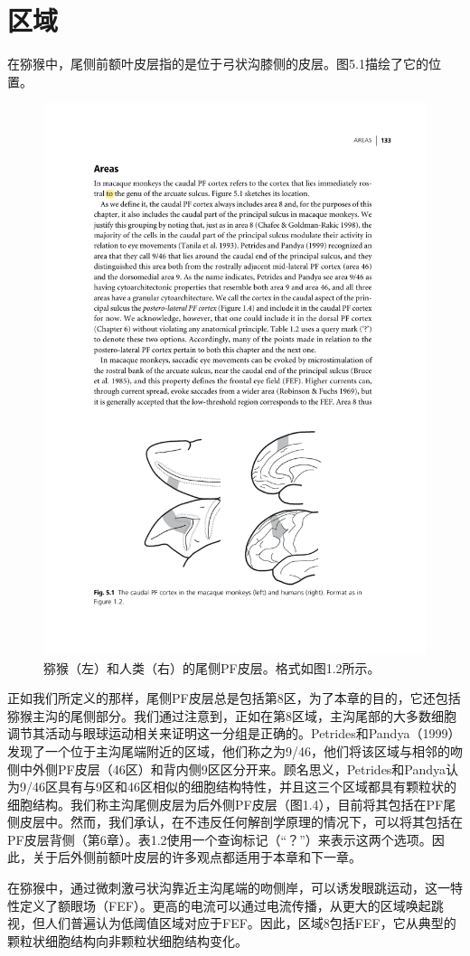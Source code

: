 \section{区域}
在猕猴中，尾侧前额叶皮层指的是位于弓状沟膝侧的皮层。图5.1描绘了它的位置。
\begin{figure}
	\centering
	\includegraphics[width=0.7\linewidth]{image_pfc/Fig_5_1}
	\caption{猕猴（左）和人类（右）的尾侧PF皮层。格式如图1.2所示。}
	\label{fig:fig}
\end{figure}

正如我们所定义的那样，尾侧PF皮层总是包括第8区，为了本章的目的，它还包括猕猴主沟的尾侧部分。我们通过注意到，正如在第8区域\cite{Chafee & Goldman-Rakic 1998}，主沟尾部的大多数细胞调节其活动与眼球运动相关\cite{Tanila et al. 1993}来证明这一分组是正确的。Petrides和Pandya（1999）发现了一个位于主沟尾端附近的区域，他们称之为9/46，他们将该区域与相邻的吻侧中外侧PF皮层（46区）和背内侧9区区分开来。顾名思义，Petrides和Pandya认为9/46区具有与9区和46区相似的细胞结构特性，并且这三个区域都具有颗粒状的细胞结构。我们称主沟尾侧皮层为后外侧PF皮层（图1.4），目前将其包括在PF尾侧皮层中。然而，我们承认，在不违反任何解剖学原理的情况下，可以将其包括在PF皮层背侧（第6章）。表1.2使用一个查询标记（“？”）来表示这两个选项。因此，关于后外侧前额叶皮层的许多观点都适用于本章和下一章。

在猕猴中，通过微刺激弓状沟靠近主沟尾端的吻侧岸，可以诱发眼跳运动\cite{Bruce et al. 1985}，这一特性定义了额眼场（FEF）。更高的电流可以通过电流传播，从更大的区域唤起跳视\cite{Robinson & Fuchs 1969}，但人们普遍认为低阈值区域对应于FEF。因此，区域8包括FEF，它从典型的颗粒状细胞结构向非颗粒状细胞结构变化\cite{Stanton et al. 1989}。

